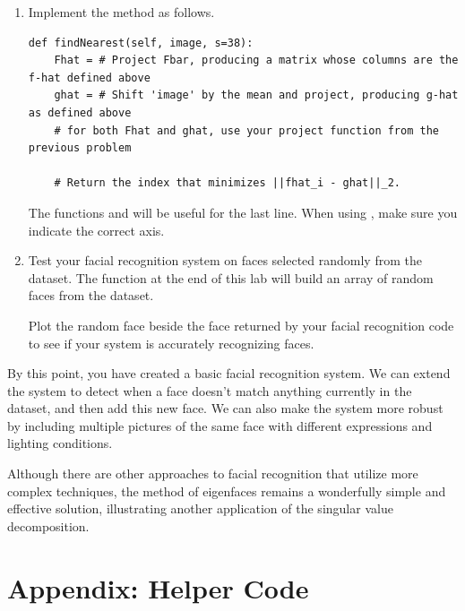 \begin{problem}
\label{prob:nearest}
\leavevmode
\begin{enumerate}
\item
Implement the method  as follows.
\begin{lstlisting}
def findNearest(self, image, s=38):
    Fhat = # Project Fbar, producing a matrix whose columns are the f-hat defined above
    ghat = # Shift 'image' by the mean and project, producing g-hat as defined above
    # for both Fhat and ghat, use your project function from the previous problem

    # Return the index that minimizes ||fhat_i - ghat||_2.
\end{lstlisting}
The functions  and  will be useful for the last line. When using , make sure you indicate the correct axis.

\item Test your facial recognition system on faces selected randomly from the  dataset.
The function  at the end of this lab will build an array of  random faces from the  dataset.

Plot the random face beside the face returned by your facial recognition code to see if your system is accurately recognizing faces.

\end{enumerate}
\end{problem}

By this point, you have created a basic facial recognition system.
We can extend the system to detect when a face doesn't match anything currently in the dataset, and then add this new face.
We can also make the system more robust by including multiple pictures of the same face with different expressions and lighting conditions.

Although there are other approaches to facial recognition that utilize more complex techniques, the method of eigenfaces remains
a wonderfully simple and effective solution, illustrating another application of the singular value decomposition.

\section*{Appendix: Helper Code} %


